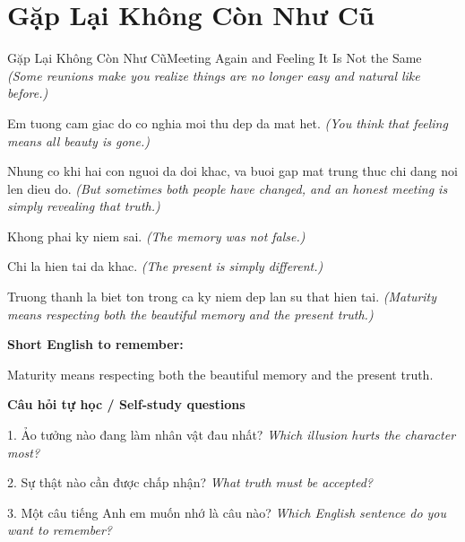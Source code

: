 \section{Gặp Lại Không Còn Như Cũ}
\begin{truyen}{Gặp Lại Không Còn Như Cũ}{Meeting Again and Feeling It Is Not the Same}
\textit{(Some reunions make you realize things are no longer easy and natural like before.)}

Em tuong cam giac do co nghia moi thu dep da mat het.
\textit{(You think that feeling means all beauty is gone.)}

Nhung co khi hai con nguoi da doi khac, va buoi gap mat trung thuc chi dang noi len dieu do.
\textit{(But sometimes both people have changed, and an honest meeting is simply revealing that truth.)}

Khong phai ky niem sai.
\textit{(The memory was not false.)}

Chi la hien tai da khac.
\textit{(The present is simply different.)}

\end{truyen}

\begin{baihoc}
Truong thanh la biet ton trong ca ky niem dep lan su that hien tai.
\textit{(Maturity means respecting both the beautiful memory and the present truth.)}
\end{baihoc}

\begin{ghinhoanh}
\textbf{Short English to remember:}

Maturity means respecting both the beautiful memory and the present truth.

\end{ghinhoanh}

\begin{tuhocnhanh}
\textbf{Câu hỏi tự học / Self-study questions}

1. Ảo tưởng nào đang làm nhân vật đau nhất? \textit{Which illusion hurts the character most?}

2. Sự thật nào cần được chấp nhận? \textit{What truth must be accepted?}

3. Một câu tiếng Anh em muốn nhớ là câu nào? \textit{Which English sentence do you want to remember?}
\end{tuhocnhanh}
\ngancach

